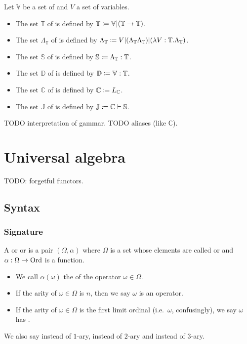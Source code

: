 \begin{definition}
Let $\mathbb{V}$ be a set of  and $V$ a set of variables.
\begin{itemize}
\item The set $\mathbb{T}$ of  is defined by $\mathbb{T} \coloneqq \mathbb{V}|(\mathbb{T}\to \mathbb{T})$.
\item The set $\Lambda_\mathbb{T}$ of  is defined by $\Lambda_\mathbb{T} \coloneqq V | (\Lambda_\mathbb{T}\Lambda_\mathbb{T}) | (\lambda V: \mathbb{T}. \Lambda_\mathbb{T})$.
\item The set $\mathbb{S}$ of  is defined by $\mathbb{S} \coloneqq \Lambda_\mathbb{T} : \mathbb{T}$.
\item The set $\mathbb{D}$ of  is defined by $\mathbb{D} \coloneqq \mathbb{V} : \mathbb{T}$.
\item The set $\mathbb{C}$ of  is defined by $\mathbb{C} \coloneqq L_\mathbb{C}$.
\item The set $\mathbb{J}$ of  is defined by $\mathbb{J} \coloneqq \mathbb{C} \vdash \mathbb{S}$.
\end{itemize}
\end{definition}
TODO interpretation of gammar. TODO aliases (like $\mathbb{C}$).

\chapter{Universal algebra}
TODO: forgetful functors.

\section{Syntax}
\subsection{Signature}
\begin{definition}
A  or  or  is a pair $(\Omega, \alpha)$ where $\Omega$ is a set whose elements are called  or  and $\alpha: \Omega \to \operatorname{Ord}$ is a function.
\begin{itemize}
    \item We call $\alpha(\omega)$ the  of the operator $\omega\in\Omega$.
    \item If the arity of $\omega\in\Omega$ is $n$, then we say $\omega$ is an  operator.
    \item If the arity of $\omega\in\Omega$ is the first limit ordinal (i.e.\ $\omega$, confusingly), we say $\omega$ has .
\end{itemize}
\end{definition}
We also say  instead of $1$-ary,  instead of $2$-ary and  instead of $3$-ary.

